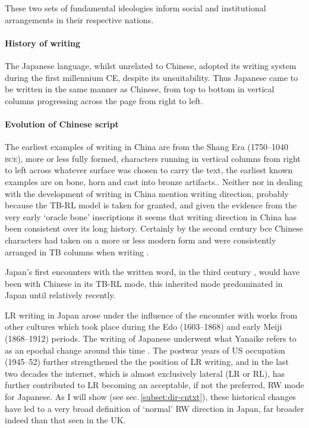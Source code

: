 \documentclass[11pt, oneside, a4paper]{scrartcl}
\begin{document}
These two sets of fundamental ideologies inform social and institutional arrangements in their respective nations.

\paragraph{History of writing}
The Japanese language, whilst unrelated to Chinese, adopted its writing system during the first millennium {\sc CE}, despite its unsuitability. Thus Japanese came to be written in the same manner as Chinese, from top to bottom in vertical columns progressing across the page from right to left. 

\paragraph{Evolution of Chinese script}
The earliest examples of writing in China are from the Shang Era (1750--1040 \textsc{bce}), more or less fully formed, characters running in vertical columns from right to left across whatever surface was chosen to carry the text, the earliest known examples are on bone, horn and cast into bronze artifacts.\citep[50]{Coulmas:2003}. Neither \citet{Norman:1988} nor \citet{Shaughnessy:1999} in dealing with the development of writing in China mention writing direction, probably because the TB-RL model is taken for granted, and given the evidence from the very early `oracle bone' inscriptions it seems that writing direction in China has been consistent over its long history. Certainly by the second century {\sc bce} Chinese characters had taken on a more or less modern form and were consistently arranged in TB columns when writing \citep[50]{Coulmas:2003}.

Japan's first encounters with the written word, in the third century \citep[50]{Rogers:2005}, would have been with Chinese in its TB-RL mode, this inherited mode predominated in Japan until relatively recently.

LR writing in Japan arose under the influence of the encounter with works from other cultures which took place during the Edo (1603--1868) and early Meiji (1868--1912) periods. The writing of Japanese underwent what Yanaike refers to as an epochal change around this time \citep{Yanaike:2003}. The postwar years of US occupation (1945--52) further strengthened the the position of LR writing, and in the last two decades the internet, which is almost exclusively lateral (LR or RL), has further contributed to LR becoming an acceptable, if not the preferred, RW mode for Japanese. As I will show (see sec.\,\ref{subset:dir-cntxt}), these historical changes have led to a very broad definition of `normal' RW direction in Japan, far broader indeed than that seen in the UK.
\end{document}
